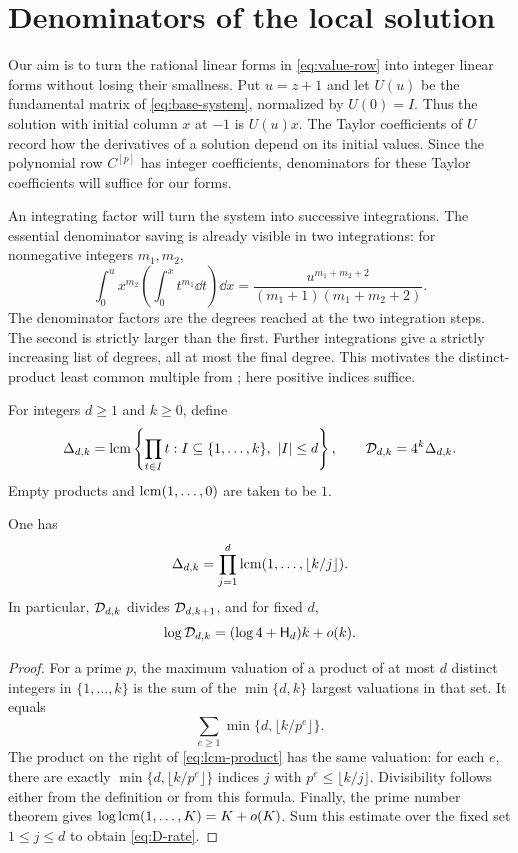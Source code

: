 \section{Denominators of the local solution}\label{sec:arithmetic}

Our aim is to turn the rational linear forms in \eqref{eq:value-row}
into integer linear forms without losing their smallness. Put $u=z+1$
and let $U(u)$ be the fundamental matrix of \eqref{eq:base-system},
normalized by $U(0)=I$. Thus the solution with initial column $x$ at $-1$
is $U(u)x$. The Taylor coefficients of $U$ record how the derivatives of
a solution depend on its initial values. Since the polynomial row
$C^{[p]}$ has integer coefficients, denominators for these Taylor
coefficients will suffice for our forms.

An integrating factor will turn the system into successive integrations.
The essential denominator saving is already visible in two integrations:
for nonnegative integers $m_1,m_2$,
\[
 \int_0^u x^{m_2}\left(\int_0^x t^{m_1}\dd t\right)\dd x
   =\frac{u^{m_1+m_2+2}}{(m_1+1)(m_1+m_2+2)}.
\]
The denominator factors are the degrees reached at the two integration
steps. The second is strictly larger than the first. Further integrations
give a strictly increasing list of degrees, all at most the final degree.
This motivates the distinct-product least common multiple from
\cite[Lemma~2]{F26}; here positive indices suffice.

For integers $d\geq1$ and $k\geq0$, define
\begin{equation}\label{eq:Delta-def}
 \Delta_{d,k}
   =\operatorname{lcm}\left\{\prod_{t\in I}t:
        I\subseteq\{1,\ldots,k\},\ |I|\leq d\right\},
 \qquad \mathcal D_{d,k}=4^k\Delta_{d,k}.
\end{equation}
Empty products and $\operatorname{lcm}(1,\ldots,0)$ are taken to be $1$.

\begin{lemma}\label{lem:lcm}
One has
\begin{equation}\label{eq:lcm-product}
 \Delta_{d,k}=\prod_{j=1}^{d}\operatorname{lcm}(1,\ldots,\lfloor k/j\rfloor).
\end{equation}
In particular, $\mathcal D_{d,k}$ divides $\mathcal D_{d,k+1}$, and for fixed $d$,
\begin{equation}\label{eq:D-rate}
 \log\mathcal D_{d,k}=(\log4+\mathsf H_d)k+o(k).
\end{equation}
\end{lemma}

\begin{proof}
For a prime $p$, the maximum valuation of a product of at most $d$
distinct integers in $\{1,\ldots,k\}$ is the sum of the $\min\{d,k\}$ largest
valuations in that set. It equals
\[
 \sum_{e\geq1}\min\{d,\lfloor k/p^e\rfloor\}.
\]
The product on the right of \eqref{eq:lcm-product} has the same valuation:
for each $e$, there are exactly $\min\{d,\lfloor k/p^e\rfloor\}$ indices
$j$ with $p^e\leq\lfloor k/j\rfloor$.
Divisibility follows either from the definition or from this formula.
Finally, the prime number theorem gives
$\log\operatorname{lcm}(1,\ldots,K)=K+o(K)$.
Sum this estimate over the fixed set $1\leq j\leq d$ to obtain
\eqref{eq:D-rate}.
\end{proof}

